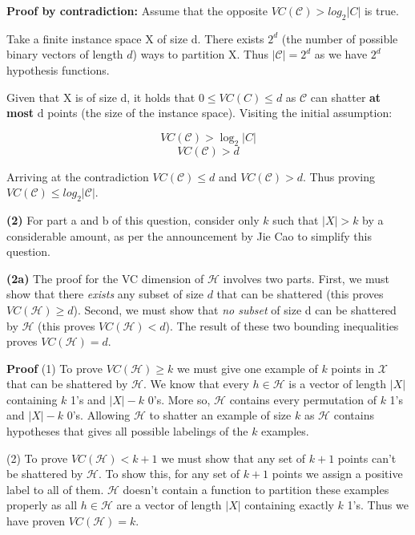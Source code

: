 \documentclass[11pt]{article}
\renewcommand\part[1]{\vspace{.10in}\textbf{(#1)}}
\begin{document}
\textbf{Proof by contradiction:} Assume that the opposite $VC(\mathcal{C}) > log_2|C|$ is true.

Take a finite instance space X of size d. There exists $2^d$ (the number of possible binary vectors of length $d$) ways to partition X. Thus $|\mathcal{C}| = 2^d$ as we have $2^d$ hypothesis functions.

Given that X is of size d, it holds that $0 \leq VC(C) \leq d$ as $\mathcal{C}$ can shatter \textbf{at most} d points (the size of the instance space). Visiting the initial assumption:

$$VC(\mathcal{C}) > \log_2|C|$$
$$VC(\mathcal{C}) > d$$

Arriving at the contradiction $VC(\mathcal{C}) \leq d$ and $VC(\mathcal{C}) > d$. Thus proving $VC(\mathcal{C}) \leq log_2|\mathcal{C}|$.

\part{2} For part a and b of this question, consider only $k$ such that $|X| > k$ by a considerable amount, as per the announcement by Jie Cao to simplify this question. 

\part{2a} The proof for the VC dimension of $\mathcal{H}$ involves two parts. First, we must show that there \textit{exists} any subset of size $d$ that can be shattered (this proves $VC(\mathcal{H}) \geq d$). Second, we must show that \textit{no subset} of size d can be shattered by $\mathcal{H}$ (this proves $VC(\mathcal{H}) < d$). The result of these two bounding inequalities proves $VC(\mathcal{H}) = d$.

\textbf{Proof} (1) To prove $VC(\mathcal{H}) \geq k$ we must give one example of $k$ points in $\mathcal{X}$ that can be shattered by $\mathcal{H}$. We know that every $h \in \mathcal{H}$ is a vector of length $|X|$ containing $k$ 1's and $|X| - k$ 0's. More so, $\mathcal{H}$ contains every permutation of $k$ 1's and $|X| - k$ 0's. Allowing $\mathcal{H}$ to shatter an example of size $k$ as $\mathcal{H}$ contains hypotheses that gives all possible labelings of the $k$ examples.

(2) To prove $VC(\mathcal{H}) < k + 1$ we must show that any set of $k + 1$ points can't be shattered by $\mathcal{H}$. To show this, for any set of $k + 1$ points we assign a positive label to all of them. $\mathcal{H}$ doesn't contain a function to partition these examples properly as all $h \in \mathcal{H}$ are a vector of length $|X|$ containing exactly $k$ 1's. Thus we have proven $VC(\mathcal{H}) = k$.
\end{document}
